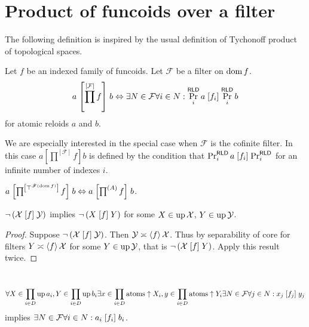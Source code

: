 \chapter{Product of funcoids over a filter}

The following definition is inspired by the usual definition of Tychonoff
product of topological spaces.

\begin{defn}
  Let $f$ be an indexed family of funcoids. Let $\mathcal{F}$ be a filter on
  $\operatorname{dom} f$.
  \[ a \mathrel{\left[ \prod^{[\mathcal{F}]} f \right]} b \Leftrightarrow
     \exists N \in \mathcal{F} \forall i \in N : \Pr^{\mathsf{RLD}}_i a
     \mathrel{\left[f_i\right]} \Pr^{\mathsf{RLD}}_i b \]
  for atomic reloids $a$ and $b$.
\end{defn}

\begin{rem}
  We are especially interested in the special case when $\mathcal{F}$ is the
  cofinite filter. In this case $a \mathrel{\left[ \prod^{[\mathcal{F}]} f
  \right]} b$ is defined by the condition that $\Pr^{\mathsf{RLD}}_i a
  \mathrel{\left[f_i\right]} \Pr^{\mathsf{RLD}}_i $ for an infinite number of
  indexes $i$.
\end{rem}

\begin{obvious}
$a \mathrel{\left[ \prod^{\mathrel{\left[ \top^{\mathscr{F} (\operatorname{dom} f)} \right]}} f
\right]} b \Leftrightarrow a \mathrel{\left[ \prod^{(A)} f \right]} b$.
\end{obvious}

\begin{prop}
  $\neg \left( \mathcal{X} \mathrel{\left[f\right]} \mathcal{Y} \right)$ implies $\neg
  \left( X \mathrel{\left[f\right]} Y \right)$ for some $X \in \operatorname{up} \mathcal{X}$, $Y
  \in \operatorname{up} \mathcal{Y}$.
\end{prop}

\begin{proof}
  Suppose $\neg \left( \mathcal{X} \mathrel{\left[f\right]} \mathcal{Y} \right)$. Then
  $\mathcal{Y} \asymp \left\langle f\right\rangle \mathcal{X}$. Thus by separability of
  core for filters $Y \asymp \left\langle f\right\rangle \mathcal{X}$ for some $Y \in
  \operatorname{up} \mathcal{Y}$, that is $\neg \left( \mathcal{X} \mathrel{\left[f\right]} Y
  \right)$. Apply this result twice.
\end{proof}

\begin{lem}
  ~  
  \[ \forall X \in \prod_{i \in D} \operatorname{up} a_i, Y \in \prod_{i \in D}
     \operatorname{up} b_i \exists x \in \prod_{i \in D} \mathrm{atoms} \uparrow X_i,
     y \in \prod_{i \in D} \mathrm{atoms} \uparrow Y_i \exists N \in
     \mathcal{F} \forall j \in N : x_j \mathrel{[f_j]} y_j \]
  implies $\exists N \in \mathcal{F} \forall i \in N : a_i \mathrel{\left[f_i\right]}
  b_i$.
\end{lem}

